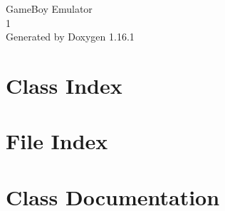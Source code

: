 \documentclass[twoside]{book}
\newcommand{\+}{\discretionary{\mbox{\scriptsize$\hookleftarrow$}}{}{}}
\newcommand{\clearemptydoublepage}{%
    \newpage{\pagestyle{empty}\cleardoublepage}%
  }
\begin{document}
  \raggedbottom
    \hypersetup{pageanchor=false,
                bookmarksnumbered=true,
                pdfencoding=unicode
               }
  \begin{titlepage}
  \vspace*{7cm}
  \begin{center}%
  {\Large Game\+Boy Emulator}\\
  [1ex]\large 1 \\
  \vspace*{1cm}
  {\large Generated by Doxygen 1.16.1}\\
  \end{center}
  \end{titlepage}
  \clearemptydoublepage
  \tableofcontents
  \clearemptydoublepage
  \hypersetup{pageanchor=true}

\chapter{Class Index}

\chapter{File Index}

\chapter{Class Documentation}










\end{document}
